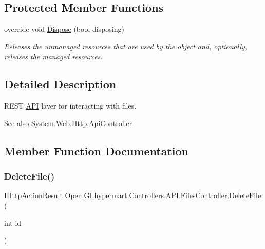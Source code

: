 \subsection*{Protected Member Functions}
\begin{DoxyCompactItemize}
\item 
override void \hyperlink{class_open_1_1_g_i_1_1hypermart_1_1_controllers_1_1_a_p_i_1_1_files_controller_abdd2147a5540d600382f2d1021a6c623}{Dispose} (bool disposing)
\begin{DoxyCompactList}\small\item\em Releases the unmanaged resources that are used by the object and, optionally, releases the managed resources. \end{DoxyCompactList}\end{DoxyCompactItemize}


\subsection{Detailed Description}
R\+E\+ST \hyperlink{namespace_open_1_1_g_i_1_1hypermart_1_1_controllers_1_1_a_p_i}{A\+PI} layer for interacting with files. 

\begin{DoxySeeAlso}{See also}
System.\+Web.\+Http.\+Api\+Controller


\end{DoxySeeAlso}


\subsection{Member Function Documentation}
\hypertarget{class_open_1_1_g_i_1_1hypermart_1_1_controllers_1_1_a_p_i_1_1_files_controller_a0eb8a707a270627264d4c2600e8d7671}{}\label{class_open_1_1_g_i_1_1hypermart_1_1_controllers_1_1_a_p_i_1_1_files_controller_a0eb8a707a270627264d4c2600e8d7671} 
\subsubsection{\texorpdfstring{Delete\+File()}{DeleteFile()}}
{\footnotesize\ttfamily I\+Http\+Action\+Result Open.\+G\+I.\+hypermart.\+Controllers.\+A\+P\+I.\+Files\+Controller.\+Delete\+File (\begin{DoxyParamCaption}\item[{int}]{id }\end{DoxyParamCaption})}



